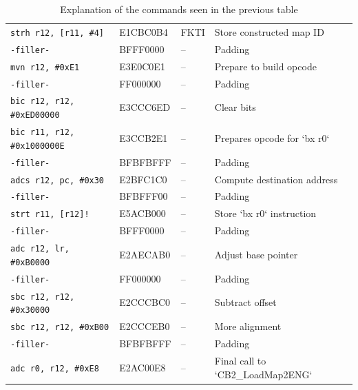\documentclass[a4paper]{usiinfbachelorproject}
\begin{document}
\begin{table}
\begin{tabular}{|l|l|l|p{6cm}|}
		\texttt{strh r12, [r11, \#4]}       & E1CBC0B4              & FKTI                    & Store constructed map ID           \\
		\texttt{-filler-}                   & BFFF0000              & --                      & Padding                            \\
		\texttt{mvn r12, \#0xE1}            & E3E0C0E1              & --                      & Prepare to build opcode            \\
		\texttt{-filler-}                   & FF000000              & --                      & Padding                            \\
		\texttt{bic r12, r12, \#0xED00000}  & E3CCC6ED              & --                      & Clear bits                         \\
		\texttt{bic r11, r12, \#0x1000000E} & E3CCB2E1              & --                      & Prepares opcode for `bx r0`        \\
		\texttt{-filler-}                   & BFBFBFFF              & --                      & Padding                            \\
		\texttt{adcs r12, pc, \#0x30}       & E2BFC1C0              & --                      & Compute destination address        \\
		\texttt{-filler-}                   & BFBFFF00              & --                      & Padding                            \\
		\texttt{strt r11, [r12]!}           & E5ACB000              & --                      & Store `bx r0` instruction          \\
		\texttt{-filler-}                   & BFFF0000              & --                      & Padding                            \\
		\texttt{adc r12, lr, \#0xB0000}     & E2AECAB0              & --                      & Adjust base pointer                \\
		\texttt{-filler-}                   & FF000000              & --                      & Padding                            \\
		\texttt{sbc r12, r12, \#0x30000}    & E2CCCBC0              & --                      & Subtract offset                    \\
		\texttt{sbc r12, r12, \#0xB00}      & E2CCCEB0              & --                      & More alignment                     \\
		\texttt{-filler-}                   & BFBFBFFF              & --                      & Padding                            \\
		\texttt{adc r0, r12, \#0xE8}        & E2AC00E8              & --                      & Final call to `CB2\_LoadMap2ENG`   \\
		\hline
	\end{tabular}

	\caption{Explanation of the commands seen in the previous table}
	\label{tab:boxes_names_explanation}
\end{table}
\end{document}
